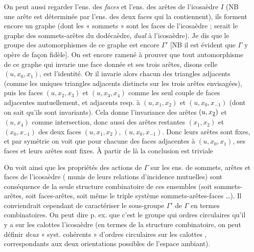 \documentclass[11pt,a4paper]{article}
\begin{document}
 On peut aussi regarder l'ens. des \emph{faces} et l'ens. des arêtes de l'icosaèdre $I$  (NB une arête est déterminée par l'ens. des deux faces qui la contiennent), ils forment encore un graphe (dont les « sommets » sont les faces de l'icosaèdre ;   serait le graphe des sommets-arêtes du dodécaèdre, \emph{dual} à l'icosaèdre). Je dis que le groupe des automorphismes de ce graphe est encore $\Gamma'$ [NB il est  évident que $\Gamma$ y opère de façon fidèle]. On est encore ramené à prouver que tout automorphisme de ce graphe qui \struck{\ill{}} invarie une face donnée et ses trois arêtes, disons \struck{\ill{}} celle $(u, x_0, x_1)$, est l'identité. Or il invarie alors chacun des  triangles adjacents (comme les uniques triangles adjacents distincts sur les trois arêtes envisagées),  puis les  faces $(u, x_2, x_3)$ et $(u, x_3, x_4)$ comme les seul couple de faces adjacentes mutuellement, et adjacents resp. à $(u, x_1, x_2)$ et $(u, x_0, x_{-1})$ (dont on sait qu'ils sont invariants). Cela donne l'invariance des  arêtes $(u, x_{\uncertain{2}})$ et $(u, x_4)$ comme intersection, donc aussi des arêtes restantes $(x_1, x_2)$ et $(x_0, x_{-1})$ des deux  faces $(u, x_1, x_2)$, $(u, x_0, x_{-1})$. Donc leurs arêtes sont fixes,  et par symétrie on voit que pour chacune des  faces adjacentes à $(u, x_0, x_1)$,  ses faces et leurs arêtes sont fixes. À partir de là la conclusion est triviale

On voit ainsi que les propriétés des actions de $\Gamma$\struck{\ill{}} sur les ens. de sommets, arêtes et faces de l'icosaèdre ( munis de leurs relations d'incidence mutuelles) sont conséquence de la seule structure combinatoire de ces ensembles (soit  sommets-arêtes, soit faces-arêtes, soit même le triple système sommets-arêtes-faces …). Il conviendrait cependant de caractériser le sous-groupe $\Gamma'$ de $\Gamma$ en termes combinatoires. On peut dire p. ex. que c'est le groupe qui   ordres circulaires qu'il y a sur les  calottes   l'icosaèdre (en termes de la structure combinatoire, on peut définir \emph{deux} « syst. cohérents » d'ordres circulaires sur les calottes \struck{\ill{}}, correspondants aux deux orientations possibles de l'espace ambiant).
\end{document}
